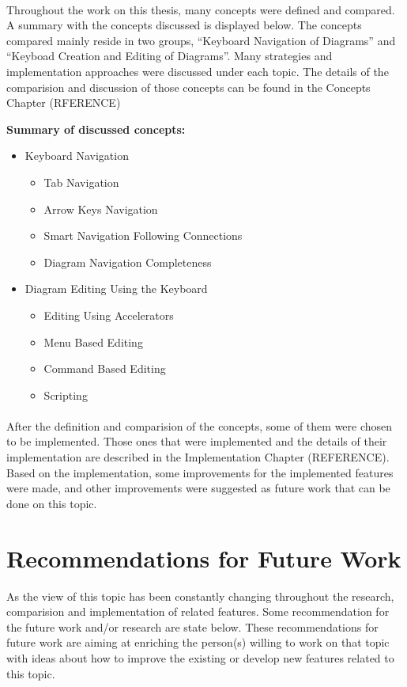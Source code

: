 \paragraph{}
Throughout the work on this thesis, many concepts were defined and compared. A summary with the concepts discussed is displayed below. The concepts compared mainly reside in two groups, ``Keyboard Navigation of Diagrams'' and ``Keyboad Creation and Editing of Diagrams''. Many strategies and implementation approaches were discussed under each topic. The details of the comparision and discussion of those concepts can be found in the Concepts Chapter (RFERENCE)

\par \noindent
{\bf Summary of discussed concepts:}
\begin{itemize}
\item Keyboard Navigation
\begin{itemize}
 	\item Tab Navigation
	\item Arrow Keys Navigation
	\item Smart Navigation Following Connections
	\item Diagram Navigation Completeness
\end{itemize}

\item Diagram Editing Using the Keyboard
\begin{itemize}
 	\item Editing Using Accelerators
	\item Menu Based Editing
	\item Command Based Editing
	\item Scripting
\end{itemize}

\end{itemize}

\paragraph{}
After the definition and comparision of the concepts, some of them were chosen to be implemented. Those ones that were implemented and the details of their implementation are described in the Implementation Chapter (REFERENCE). Based on the implementation, some improvements for the implemented features were made, and other improvements were suggested as future work that can be done on this topic.


\section{Recommendations for Future Work}
As the view of this topic has been constantly changing throughout the research, comparision and implementation of related features. Some recommendation for the future work and/or research are state below. These recommendations for future work are aiming at enriching the person(s) willing to work on that topic with ideas about how to improve the existing or develop new features related to this topic.

